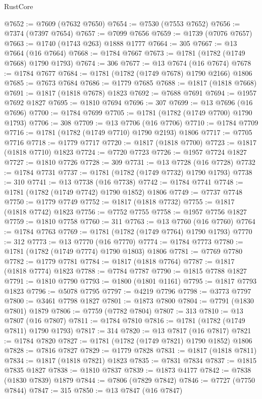 \begin{lexlean}{RustCore}
\begin{coremodule}
@7652 := @7609 (@7632 @7650)
@7654 := @7530 (@7553 @7652)
@7656 := @7374 (@7397 @7654)
@7657 := @7099 @7656
@7659 := @1739 (@7076 @7657)
@7663 := @1740 (@1743 @263) @1888 @1777
@7664 := 305
@7667 := @13 @7664 (@16 @7664)
@7668 := @1784 @7667
@7673 := @1781 (@1782 (@1749 @7668) @1790 @1793)
@7674 := 306
@7677 := @13 @7674 (@16 @7674)
@7678 := @1784 @7677
@7684 := @1781 (@1782 (@1749 @7678) @1790 @2166) @1806
@7685 := @7673 @7684
@7686 := @1779 @7685
@7688 := @1817 (@1818 @7668)
@7691 := @1817 (@1818 @7678) @1823
@7692 := @7688 @7691
@7694 := @1957 @7692 @1827
@7695 := @1810 @7694
@7696 := 307
@7699 := @13 @7696 (@16 @7696)
@7700 := @1784 @7699
@7705 := @1781 (@1782 (@1749 @7700) @1790 @1793)
@7706 := 308
@7709 := @13 @7706 (@16 @7706)
@7710 := @1784 @7709
@7716 := @1781 (@1782 (@1749 @7710) @1790 @2193) @1806
@7717 := @7705 @7716
@7718 := @1779 @7717
@7720 := @1817 (@1818 @7700)
@7723 := @1817 (@1818 @7710) @1823
@7724 := @7720 @7723
@7726 := @1957 @7724 @1827
@7727 := @1810 @7726
@7728 := 309
@7731 := @13 @7728 (@16 @7728)
@7732 := @1784 @7731
@7737 := @1781 (@1782 (@1749 @7732) @1790 @1793)
@7738 := 310
@7741 := @13 @7738 (@16 @7738)
@7742 := @1784 @7741
@7748 := @1781 (@1782 (@1749 @7742) @1790 @1852) @1806
@7749 := @7737 @7748
@7750 := @1779 @7749
@7752 := @1817 (@1818 @7732)
@7755 := @1817 (@1818 @7742) @1823
@7756 := @7752 @7755
@7758 := @1957 @7756 @1827
@7759 := @1810 @7758
@7760 := 311
@7763 := @13 @7760 (@16 @7760)
@7764 := @1784 @7763
@7769 := @1781 (@1782 (@1749 @7764) @1790 @1793)
@7770 := 312
@7773 := @13 @7770 (@16 @7770)
@7774 := @1784 @7773
@7780 := @1781 (@1782 (@1749 @7774) @1790 @1803) @1806
@7781 := @7769 @7780
@7782 := @1779 @7781
@7784 := @1817 (@1818 @7764)
@7787 := @1817 (@1818 @7774) @1823
@7788 := @7784 @7787
@7790 := @1815 @7788 @1827
@7791 := @1810 @7790
@7793 := @1800 (@1801 @1161)
@7795 := @1817 @7793 @1823
@7796 := @5078 @7795
@7797 := @4219 @7796
@7798 := @3773 @7797
@7800 := @3461 @7798 @1827
@7801 := @1873 @7800
@7804 := @7791 (@1830 @7801) @1879
@7806 := @7759 (@7782 @7804)
@7807 := 313
@7810 := @13 @7807 (@16 @7807)
@7811 := @1784 @7810
@7816 := @1781 (@1782 (@1749 @7811) @1790 @1793)
@7817 := 314
@7820 := @13 @7817 (@16 @7817)
@7821 := @1784 @7820
@7827 := @1781 (@1782 (@1749 @7821) @1790 @1852) @1806
@7828 := @7816 @7827
@7829 := @1779 @7828
@7831 := @1817 (@1818 @7811)
@7834 := @1817 (@1818 @7821) @1823
@7835 := @7831 @7834
@7837 := @1815 @7835 @1827
@7838 := @1810 @7837
@7839 := @1873 @4177
@7842 := @7838 (@1830 @7839) @1879
@7844 := @7806 (@7829 @7842)
@7846 := @7727 (@7750 @7844)
@7847 := 315
@7850 := @13 @7847 (@16 @7847)

\end{coremodule}
\end{lexlean}
